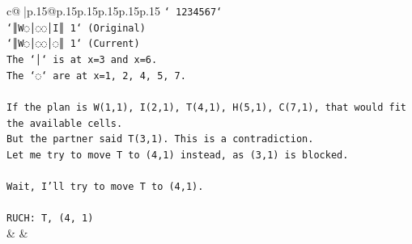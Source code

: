 \documentclass{article}
\begin{document}
{\begin{supertabular}{c@{$\;$}|p{.15\linewidth}@{}p{.15\linewidth}p{.15\linewidth}p{.15\linewidth}p{.15\linewidth}p{.15\linewidth}}
{{{\texttt{` 1234567`} \\
\texttt{`║W◌│◌◌│I║ 1` (Original)} \\
\texttt{`║W◌│◌◌│◌║ 1` (Current)} \\
\texttt{The `│` is at x=3 and x=6.} \\
\texttt{The `◌` are at x=1, 2, 4, 5, 7.} \\
\\ 
\texttt{If the plan is W(1,1), I(2,1), T(4,1), H(5,1), C(7,1), that would fit the available cells.} \\
\texttt{But the partner said T(3,1). This is a contradiction.} \\
\texttt{Let me try to move T to (4,1) instead, as (3,1) is blocked.} \\
\\ 
\texttt{Wait, I'll try to move T to (4,1).} \\
\\ 
\texttt{RUCH: T, (4, 1)} \\
            }
        }
    }
    & & \\ \\


\end{supertabular}}
\end{document}
